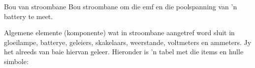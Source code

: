 \begin{activity}{Bou van stroombane}
Bou stroombane om die emf en die poolspanning van  'n battery te meet.

Algemene elemente (komponente) wat in stroombane aangetref word sluit in
gloeilampe, batterye, geleiers, skakelaars, weerstande, voltmeters en ammeters.
Jy het alreeds van baie hiervan geleer. Hieronder is  'n tabel met die items en
hulle simbole:


\end{activity}
